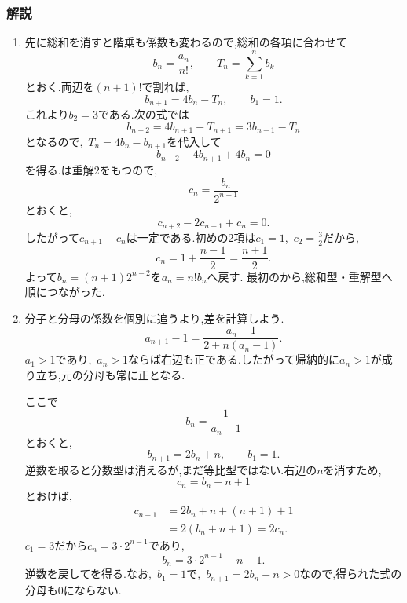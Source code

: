       \subsubsection{解説}\label{節：応用難易度：解法}\label{節：高難易度のもの：解法}
        \begin{enumerate}[label=\textbf{問\arabic*.},leftmargin=3.8em,format=\bookitemlink{practice-advanced}{solution}{problem}]
          \item 先に総和を消すと階乗も係数も変わるので,総和の各項に合わせて
                \[
                  b_n=\frac{a_n}{n!},\qquad
                  T_n=\sum_{k=1}^{n}b_k
                \]
                とおく.両辺を$(n+1)!$で割れば,
                \[
                  b_{n+1}=4b_n-T_n,\qquad b_1=1.
                \]
                これより$b_2=3$である.次の式では
                \[
                  b_{n+2}=4b_{n+1}-T_{n+1}
                          =3b_{n+1}-T_n
                \]
                となるので,\, $T_n=4b_n-b_{n+1}$を代入して
                \[
                  b_{n+2}-4b_{n+1}+4b_n=0
                \]
                を得る.は重解$2$をもつので,
                \[
                  c_n=\frac{b_n}{2^{n-1}}
                \]
                とおくと,
                \[
                  c_{n+2}-2c_{n+1}+c_n=0.
                \]
                したがって$c_{n+1}-c_n$は一定である.初めの2項は$c_1=1$,\, $\displaystyle c_2=\frac{3}{2}$だから,
                \[
                  c_n=1+\frac{n-1}{2}=\frac{n+1}{2}.
                \]
                よって$b_n=(n+1)2^{n-2}$を$a_n=n!b_n$へ戻す.
                最初のから,総和型・重解型へ順につながった.
          \item 分子と分母の係数を個別に追うより,差を計算しよう.
                \[
                  a_{n+1}-1
                  =\frac{a_n-1}{2+n(a_n-1)}.
                \]
                $a_1>1$であり,\, $a_n>1$ならば右辺も正である.したがって帰納的に$a_n>1$が成り立ち,元の分母も常に正となる.

                ここで
                \[
                  b_n=\frac{1}{a_n-1}
                \]
                とおくと,
                \[
                  b_{n+1}=2b_n+n,\qquad b_1=1.
                \]
                逆数を取ると分数型は消えるが,まだ等比型ではない.右辺の$n$を消すため,
                \[
                  c_n=b_n+n+1
                \]
                とおけば,
                \begin{align*}
                  c_{n+1}
                    &=2b_n+n+(n+1)+1\\
                    &=2(b_n+n+1)=2c_n.
                \end{align*}
                $c_1=3$だから$c_n=3\cdot2^{n-1}$であり,
                \[
                  b_n=3\cdot2^{n-1}-n-1.
                \]
                逆数を戻してを得る.なお,\, $b_1=1$で,\, $b_{n+1}=2b_n+n>0$なので,得られた式の分母も$0$にならない.


\end{enumerate}
